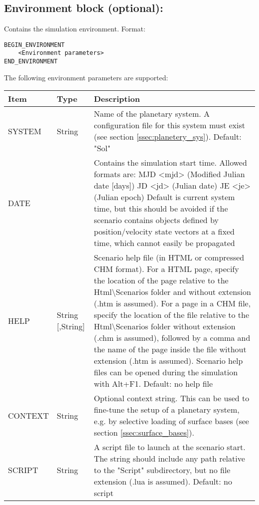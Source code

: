 \documentclass[Orbiter Developer Manual.tex]{subfiles}
\begin{document}
\subsection*{Environment block (optional):}
Contains the simulation environment. Format:

\begin{lstlisting}[language=OSFS]
BEGIN_ENVIRONMENT
	<Environment parameters>
END_ENVIRONMENT
\end{lstlisting}

\noindent
The following environment parameters are supported:

\begin{table}[H]
	\centering
	\begin{tabularx}{\textwidth}{ |l|l|X| }
	\hline\rule{0pt}{2ex}
	\textbf{Item} & \textbf{Type} & \textbf{Description}\\
	\hline\rule{0pt}{2ex}
	SYSTEM & String & Name of the planetary system. A configuration file for this system must exist (see section \ref{ssec:planetery_sys}). Default: "Sol"\\
	\hline\rule{0pt}{2ex}
	DATE &   & Contains the simulation start time. Allowed formats are:\newline
	MJD <mjd> (Modified Julian date [days])\newline
	JD <jd> (Julian date)\newline
	JE <je> (Julian epoch)\newline
	Default is current system time, but this should be avoided if the scenario contains objects defined by position/velocity  state vectors at a fixed time, which cannot easily be propagated\\
	\hline\rule{0pt}{2ex}
	HELP & String [,String] & Scenario help file (in HTML or compressed CHM format). For a HTML page, specify the location of the page relative to the Html\textbackslash Scenarios folder and without extension (.htm is assumed). For a page in a CHM file, specify the location of the file relative to the Html\textbackslash Scenarios folder without extension (.chm is assumed), followed by a comma and the name of the page inside the file without extension (.htm is assumed). Scenario help files can be opened during the simulation with Alt+F1. Default: no help file\\
	\hline\rule{0pt}{2ex}
	CONTEXT & String & Optional context string. This can be used to fine-tune the setup of a planetary system, e.g. by selective loading of surface bases (see section \ref{ssec:surface_bases}).\\
	\hline\rule{0pt}{2ex}
	SCRIPT & String & A script file to launch at the scenario start. The string should include any path relative to the "Script" subdirectory, but no file extension (.lua is assumed). Default: no script\\
	\hline
	\end{tabularx}
\end{table}
\end{document}
